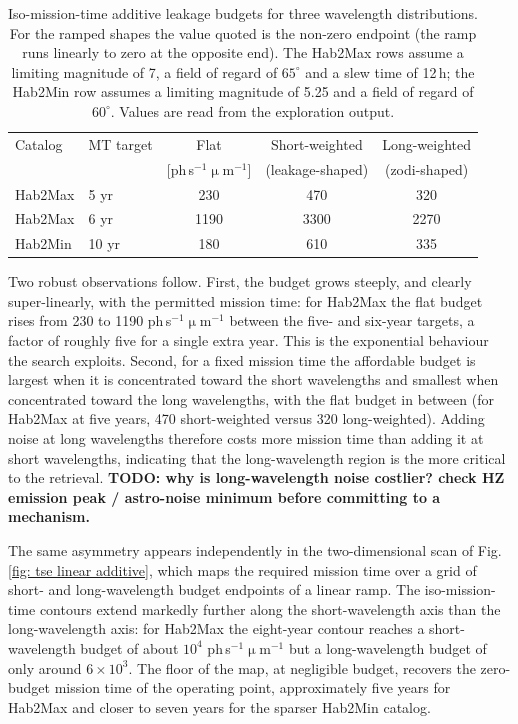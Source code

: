\documentclass[12pt,a4paper]{article}
\numberwithin{equation}{section}
\numberwithin{figure}{section}
\numberwithin{table}{section}
\begin{document}
\begin{table}[htbp]
\centering
\begin{tabular}{@{}llccc@{}}
\toprule
Catalog & MT target & Flat & Short-weighted & Long-weighted \\
        &           & [ph\,s$^{-1}$$\upmu$m$^{-1}$] & (leakage-shaped) & (zodi-shaped) \\
\midrule
Hab2Max & 5 yr  & 230  & 470 & 320 \\
Hab2Max & 6 yr  & 1190 & 3300 & 2270 \\
Hab2Min & 10 yr & 180  & 610 & 335 \\
\bottomrule
\end{tabular}
\caption{Iso-mission-time additive leakage budgets for three wavelength distributions. For the ramped shapes the value quoted is the non-zero endpoint (the ramp runs linearly to zero at the opposite end). The Hab2Max rows assume a limiting magnitude of 7, a field of regard of $65^\circ$ and a slew time of 12\,h; the Hab2Min row assumes a limiting magnitude of 5.25 and a field of regard of $60^\circ$. Values are read from the exploration output.}
\label{tab: budget shapes}
\end{table}

Two robust observations follow. First, the budget grows steeply, and clearly super-linearly, with the permitted mission time: for Hab2Max the flat budget rises from 230 to 1190 ph\,s$^{-1}$$\upmu$m$^{-1}$ between the five- and six-year targets, a factor of roughly five for a single extra year. This is the exponential behaviour the search exploits. Second, for a fixed mission time the affordable budget is largest when it is concentrated toward the short wavelengths and smallest when concentrated toward the long wavelengths, with the flat budget in between (for Hab2Max at five years, 470 short-weighted versus 320 long-weighted). Adding noise at long wavelengths therefore costs more mission time than adding it at short wavelengths, indicating that the long-wavelength region is the more critical to the retrieval. \textbf{TODO: why is long-wavelength noise costlier? check HZ emission peak / astro-noise minimum before committing to a mechanism.}

The same asymmetry appears independently in the two-dimensional scan of Fig. \ref{fig: tse linear additive}, which maps the required mission time over a grid of short- and long-wavelength budget endpoints of a linear ramp. The iso-mission-time contours extend markedly further along the short-wavelength axis than the long-wavelength axis: for Hab2Max the eight-year contour reaches a short-wavelength budget of about $10^4$ ph\,s$^{-1}$$\upmu$m$^{-1}$ but a long-wavelength budget of only around $6\times10^3$. The floor of the map, at negligible budget, recovers the zero-budget mission time of the operating point, approximately five years for Hab2Max and closer to seven years for the sparser Hab2Min catalog.
\end{document}
